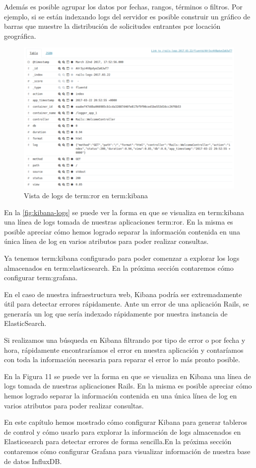 Además es posible agrupar los datos por fechas, rangos, términos o filtros. Por
ejemplo, si se están indexando logs del servidor es posible construir un
gráfico de barras que muestre la distribución de solicitudes 
entrantes por locación geográfica.

\begin{figure}
  \includegraphics[width=\linewidth]{src/images/05-capitulo-5/kibana-logs.png}
  \caption{Vista de logs de \gls{term:ror} en \gls{term:kibana}}
  \label{fig:kibana-logs}
\end{figure}

En la \autoref{fig:kibana-logs} se puede ver la forma en que se visualiza en
\gls{term:kibana} una línea de logs tomada de nuestras aplicaciones
\gls{term:ror}. En la misma es posible apreciar cómo hemos logrado separar la
información contenida en una única línea de log en varios atributos para poder
realizar consultas.

Ya tenemos \gls{term:kibana} configurado para poder comenzar a explorar los
logs almacenados en \gls{term:elasticsearch}. En la próxima sección contaremos
cómo configurar \gls{term:grafana}.


En el caso de nuestra infraestructura web, Kibana podría ser extremadamente útil para detectar errores rápidamente. Ante un error de una aplicación Rails, se generaría un log que sería indexado rápidamente por nuestra instancia de ElasticSearch.

Si realizamos una búsqueda en Kibana filtrando por tipo de error o por fecha y hora, rápidamente encontraríamos el error en nuestra aplicación y contaríamos con toda la información necesaria para reparar el error lo más pronto posible.

En la Figura 11 se puede ver la forma en que se visualiza en Kibana una
línea de logs tomada de nuestras aplicaciones Rails. En la misma es posible apreciar cómo hemos logrado separar la información contenida en una única línea de log en varios atributos para poder realizar consultas.

En este capítulo hemos mostrado cómo configurar Kibana para generar tableros de control y cómo usarlo para explorar la información de logs almacenados en Elasticsearch para detectar errores de forma sencilla.En la próxima sección contaremos cómo configurar Grafana para visualizar información de nuestra base de datos InfluxDB.
